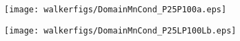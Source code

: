 \documentclass[varwidth, border=10pt]{standalone}
\begin{document}

\begin{figure}
  \centering
  \begin{subfigure}{0.48\textwidth}
  \centering
  \texttt{[image: walkerfigs/DomainMnCond\_P25P100a.eps]}
\end{subfigure}
\begin{subfigure}{0.48\textwidth}
\centering
  \texttt{[image: walkerfigs/DomainMnCond\_P25LP100Lb.eps]}
\end{subfigure}
\end{figure}


 
\end{document}
